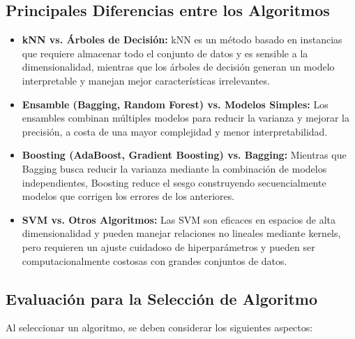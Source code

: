 \documentclass[a4paper, 11pt]{article}
\begin{document}
\subsection{Principales Diferencias entre los Algoritmos}

\begin{itemize}
    \item \textbf{kNN vs. Árboles de Decisión:} kNN es un método basado en instancias que requiere almacenar todo el conjunto de datos y es sensible a la dimensionalidad, mientras que los árboles de decisión generan un modelo interpretable y manejan mejor características irrelevantes.

    \item \textbf{Ensamble (Bagging, Random Forest) vs. Modelos Simples:} Los ensambles combinan múltiples modelos para reducir la varianza y mejorar la precisión, a costa de una mayor complejidad y menor interpretabilidad.

    \item \textbf{Boosting (AdaBoost, Gradient Boosting) vs. Bagging:} Mientras que Bagging busca reducir la varianza mediante la combinación de modelos independientes, Boosting reduce el sesgo construyendo secuencialmente modelos que corrigen los errores de los anteriores.

    \item \textbf{SVM vs. Otros Algoritmos:} Las SVM son eficaces en espacios de alta dimensionalidad y pueden manejar relaciones no lineales mediante kernels, pero requieren un ajuste cuidadoso de hiperparámetros y pueden ser computacionalmente costosas con grandes conjuntos de datos.
\end{itemize}

\subsection{Evaluación para la Selección de Algoritmo}

Al seleccionar un algoritmo, se deben considerar los siguientes aspectos:
\end{document}
